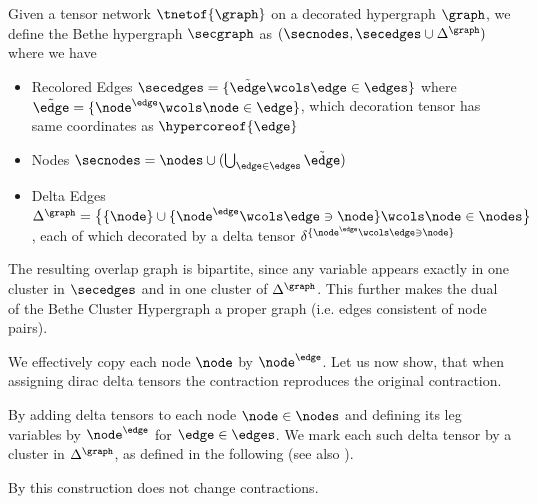 \begin{definition}
    Given a tensor network $\tnetof{\graph}$ on a decorated hypergraph $\graph$, we define the Bethe hypergraph $\secgraph$ as
    $(\secnodes, \secedges \cup \Delta^{\graph})$ where we have
    \begin{itemize}
        \item Recolored Edges $\secedges = \{\tilde{\edge} \wcols \edge\in \edges\}$ where $\tilde{\edge} = \{\node^{\edge} \wcols \node\in\edge\}$, which decoration tensor has same coordinates as $\hypercoreof{\edge}$
        \item Nodes $\secnodes = \nodes \cup (\bigcup_{\edge\in\edges}\tilde{\edge})$ %
        \item Delta Edges $\Delta^{\graph} =  \big\{ \{\node\} \cup \{\node^{\edge} \wcols \edge\ni\node \}\wcols \node\in\nodes \big\} $, each of which decorated by a delta tensor $\delta^{\{\node^{\edge} \wcols \edge\ni\node \}}$
    \end{itemize}
\end{definition}

The resulting overlap graph is bipartite, since any variable appears exactly in one cluster in $\secedges$ and in one cluster of $\Delta^{\graph}$.
This further makes the dual of the Bethe Cluster Hypergraph a proper graph (i.e. edges consistent of node pairs).

We effectively copy each node $\node$ by $\node^{\edge}$.
Let us now show, that when assigning dirac delta tensors the contraction reproduces the original contraction.

By adding delta tensors to each node $\node\in\nodes$ and defining its leg variables by $\node^{\edge}$ for $\edge\in\edges$.
We mark each such delta tensor by a cluster in $\Delta^{\graph}$, as defined in the following (see also ).

By  this construction does not change contractions.

